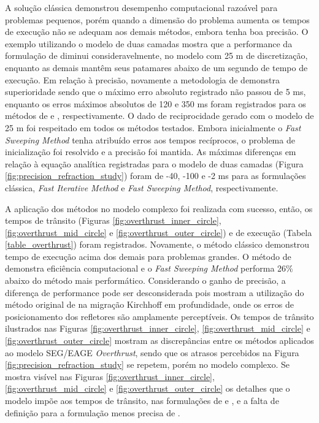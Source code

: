 A solução clássica demonstrou desempenho computacional razoável para problemas pequenos, porém quando a dimensão do problema aumenta os tempos de execução não se adequam aos demais métodos, embora tenha boa precisão. O exemplo utilizando o modelo de duas camadas mostra que a performance da formulação de  diminui consideravelmente, no modelo com 25 m de discretização, enquanto as demais mantêm seus patamares abaixo de um segundo de tempo de execução. Em relação à precisão, novamente a metodologia de  demonstra superioridade sendo que o máximo erro absoluto registrado não passou de 5 ms, enquanto os erros máximos absolutos de 120 e 350 ms foram registrados para os métodos de  e , respectivamente. O dado de reciprocidade gerado com o modelo de 25 m foi respeitado em todos os métodos testados. Embora inicialmente o \textit{Fast Sweeping Method} tenha atribuído erros aos tempos recíprocos, o problema de inicialização foi resolvido e a precisão foi mantida. As máximas diferenças em relação à equação analítica registradas para o modelo de duas camadas (Figura \ref{fig:precision_refraction_study}) foram de -40, -100 e -2 ms para as formulações clássica, \textit{Fast Iterative Method} e \textit{Fast Sweeping Method}, respectivamente.         

A aplicação dos métodos no modelo complexo foi realizada com sucesso, então, os tempos de trânsito (Figuras \ref{fig:overthrust_inner_circle}, \ref{fig:overthrust_mid_circle} e \ref{fig:overthrust_outer_circle}) e de execução (Tabela \ref{table_overthrust}) foram registrados. Novamente, o método clássico demonstrou tempo de execução acima dos demais para problemas grandes. O método de  demonstra eficiência computacional e o \textit{Fast Sweeping Method} performa 26$\%$ abaixo do método mais performático. Considerando o ganho de precisão, a diferença de performance pode ser desconsiderada pois  mostram a utilização do método original de  na migração Kirchhoff em profundidade, onde os erros de posicionamento dos refletores são amplamente perceptíveis. Os tempos de trânsito ilustrados nas Figuras \ref{fig:overthrust_inner_circle}, \ref{fig:overthrust_mid_circle} e \ref{fig:overthrust_outer_circle} mostram as discrepâncias entre os métodos aplicados ao modelo SEG/EAGE \textit{Overthrust}, sendo que os atrasos percebidos na Figura \ref{fig:precision_refraction_study} se repetem, porém no modelo complexo. Se mostra visível nas Figuras \ref{fig:overthrust_inner_circle}, \ref{fig:overthrust_mid_circle} e \ref{fig:overthrust_outer_circle} os detalhes que o modelo impõe aos tempos de trânsito, nas formulações de  e , e a falta de definição para a formulação menos precisa de .  
 
